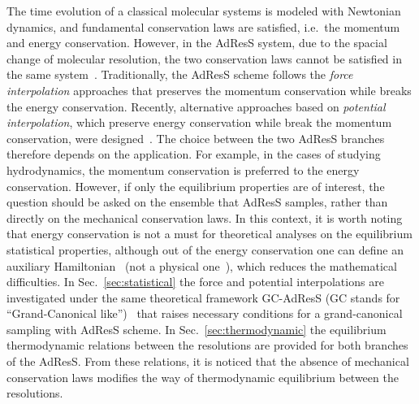\documentclass[epjST]{svjour}
\begin{document}
The time evolution of a classical molecular systems
is modeled with Newtonian dynamics, and fundamental conservation laws
are satisfied, i.e.~the momentum and energy conservation.
However, in the AdResS system,
due to the spacial change of molecular resolution,
the two conservation laws cannot be satisfied in the same system~\cite{praprotnik2011comment,dellesite2007some}.
Traditionally, the AdResS scheme follows the \emph{force interpolation} approaches
that preserves the momentum conservation while breaks the energy
conservation.
Recently,
alternative approaches based on \emph{potential interpolation},
which preserve energy conservation while break the momentum conservation,
were designed~\cite{wang2013grand,potestio2013hamiltonian}.
The choice between the two AdResS branches therefore depends on the application. For example, in the
cases of studying hydrodynamics, the momentum conservation is preferred to the energy conservation.
However, if only the equilibrium properties are of interest,
the question should be asked on the ensemble that AdResS samples,
rather than directly on the mechanical conservation laws.
In this context,
it is worth noting that energy conservation is not a must for theoretical analyses on the equilibrium statistical properties,
although out of the energy conservation
one can define an auxiliary Hamiltonian~\cite{wang2013grand,agarwal2014chemical}
(not a physical one~\cite{dellesite2013multiscale}),
which reduces the mathematical difficulties.
In Sec.~\ref{sec:statistical} the force and potential interpolations are investigated 
under the same theoretical framework GC-AdResS (GC stands for ``Grand-Canonical like'')~\cite{wang2013grand} that raises necessary conditions
for a grand-canonical sampling with AdResS scheme.
In Sec.~\ref{sec:thermodynamic} the equilibrium thermodynamic relations between the resolutions are
provided for both branches of the AdResS.
From these relations, it is noticed that the absence of mechanical conservation laws 
modifies the way of thermodynamic equilibrium between the resolutions.
\end{document}

